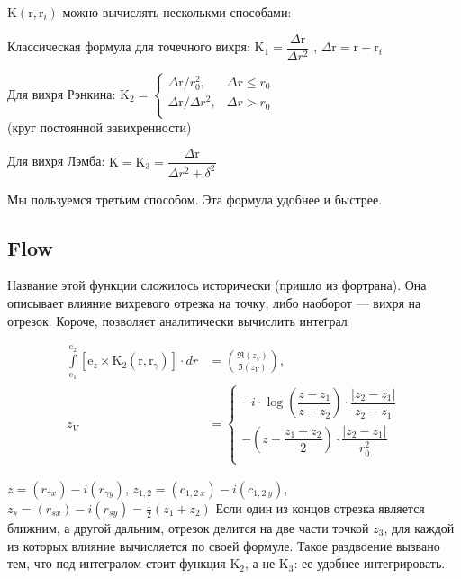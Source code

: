 \documentclass[a4paper,14pt]{extreport}
\newcommand{\br}[1]{\boldsymbol{\mathrm{#1}}}
\renewcommand{\vec}[1]{\br{#1}}
\newenvironment{packed_enum}{
\begin{enumerate}
  \setlength{\itemsep}{1pt}
  \setlength{\parskip}{0pt}
  \setlength{\parsep}{0pt}
}{\end{enumerate}}
\begin{document}
$\br K (\br r, \br r_i)$ можно вычислять несколькми способами:
\begin{packed_enum}
\item Классическая формула для точечного вихря:
$\br K_1 = \dfrac {\Delta\br r}{\Delta r^2}$
, $\Delta \vec r = \vec r - \vec r_i$

\item Для вихря Рэнкина:
$\br K_2 = \begin{cases}
\Delta\br r / r_0^2,	&\Delta r \le r_0 \\
{\Delta\br r}/{\Delta r^2}, 	&\Delta r>r_0\\
\end{cases}$
\\ (круг постоянной завихренности)

\item Для вихря Лэмба:
$\br K = \br K_3 = \dfrac {\Delta\br r}{\Delta r^2 + \delta^2}$
\end{packed_enum}

Мы пользуемся третьим способом. Эта формула удобнее и быстрее.

\subsection{Flow}
\label{Flow}

Название этой функции сложилось исторически (пришло из фортрана). Она описывает влияние вихревого отрезка на точку, либо наоборот --- вихря на отрезок.
Короче, позволяет аналитически вычислить интеграл

\begin{equation}
\label{eq_Flow}
\begin{split}
\int\limits_{\vec c_1}^{\vec c_2} [\vec e_z \times \vec K_2(\vec r,\vec r_\gamma)] \cdot dr &= \binom{\Re(z_V)}{\Im(z_V)}, \\
z_V &= \begin{cases}
	-i \cdot \log \left(\dfrac{z-z_1}{z-z_2}\right) \cdot \dfrac{|z_2 - z_1|}{z_2 - z_1} \\
	- \left(z - \dfrac{z_1+z_2}{2} \right) \cdot \dfrac{|z_2 - z_1|}{r_0^2} \\
\end{cases}
\end{split}
\end{equation}

$z = (r_{\gamma x}) - i (r_{\gamma y})$, $z_{1,2} = (c_{1,2~x}) - i (c_{1,2~y})$, $z_s = (r_{sx}) - i (r_{sy}) = \frac{1}{2}(z_1 + z_2)$
Если один из концов отрезка является ближним, а другой дальним, 
отрезок делится на две части точкой $z_3$, для каждой
из которых влияние вычисляется по своей формуле.
Такое раздвоение вызвано тем, что под интегралом стоит
функция $\vec K_2$, а не $\vec K_3$: ее удобнее интегрировать.
\end{document}
